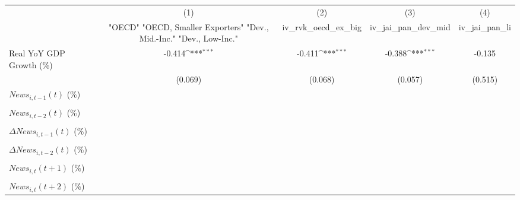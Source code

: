 {
\def\sym#1{\ifmmode^{#1}\else\(^{#1}\)\fi}
\begin{tabular}{l*{4}{c}}
\toprule
                    &\multicolumn{1}{c}{(1)}&\multicolumn{1}{c}{(2)}&\multicolumn{1}{c}{(3)}&\multicolumn{1}{c}{(4)}\\
                    &\multicolumn{1}{c}{ "OECD" "OECD, Smaller Exporters" "Dev., Mid.-Inc." "Dev., Low-Inc."}&\multicolumn{1}{c}{iv_rvk_oecd_ex_big}&\multicolumn{1}{c}{iv_jai_pan_dev_mid}&\multicolumn{1}{c}{iv_jai_pan_li}\\
\midrule
Real YoY GDP Growth (\%)&      -0.414\sym{***}&      -0.411\sym{***}&      -0.388\sym{***}&      -0.135         \\
                    &     (0.069)         &     (0.068)         &     (0.057)         &     (0.515)         \\
\addlinespace
$ News_{i,t-1}(t)$ (\%)&                     &                     &                     &                     \\
                    &                     &                     &                     &                     \\
\addlinespace
$ News_{i,t-2}(t)$ (\%)&                     &                     &                     &                     \\
                    &                     &                     &                     &                     \\
\addlinespace
$ \Delta News_{i,t-1}(t)$ (\%)&                     &                     &                     &                     \\
                    &                     &                     &                     &                     \\
\addlinespace
$ \Delta News_{i,t-2}(t)$ (\%)&                     &                     &                     &                     \\
                    &                     &                     &                     &                     \\
\addlinespace
$ News_{i,t}(t+1)$ (\%)&                     &                     &                     &                     \\
                    &                     &                     &                     &                     \\
\addlinespace
$ News_{i,t}(t+2)$ (\%)&                     &                     &                     &                     \\

\end{tabular}}
